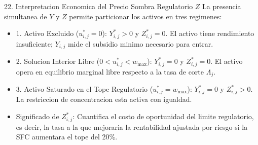\documentclass[aspectratio=169,10pt]{beamer}
\begin{document}
\begin{frame}{22. Interpretacion Economica del Precio Sombra Regulatorio $Z$}
  La presencia simultanea de $Y$ y $Z$ permite particionar los activos en tres regimenes:
  \vspace{0.3cm}
  \begin{itemize}
    \item 1. Activo Excluido ($u_{i,j}^* = 0$): $Y_{i,j}^* > 0$ y $Z_{i,j}^* = 0$.
    El activo tiene rendimiento insuficiente; $Y_{i,j}$ mide el subsidio minimo necesario para entrar.
    \vspace{0.3cm}
    \item 2. Solucion Interior Libre ($0 < u_{i,j}^* < w_{\max}$): $Y_{i,j}^* = 0$ y $Z_{i,j}^* = 0$.
    El activo opera en equilibrio marginal libre respecto a la tasa de corte $\Lambda_j$.
    \vspace{0.3cm}
    \item 3. Activo Saturado en el Tope Regulatorio ($u_{i,j}^* = w_{\max}$): $Y_{i,j}^* = 0$ y $Z_{i,j}^* > 0$.
    La restriccion de concentracion esta activa con igualdad.
    \vspace{0.2cm}
    \item Significado de $Z_{i,j}^*$: Cuantifica el costo de oportunidad del limite regulatorio, es decir, la tasa a la que mejoraria la rentabilidad ajustada por riesgo si la SFC aumentara el tope del 20\%.
  \end{itemize}
\end{frame}
\end{document}
